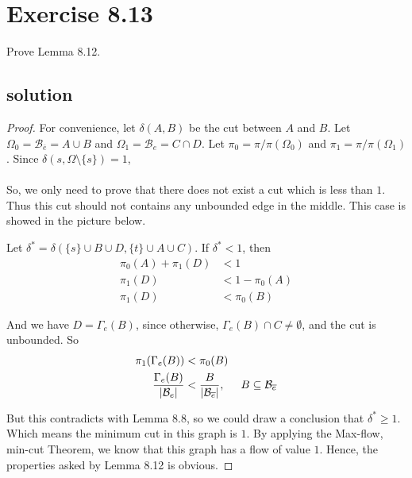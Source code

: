 \documentclass{article}
\begin{document}
\section{Exercise 8.13}
Prove Lemma 8.12.

\subsection{solution}

\begin{proof}
  
For convenience, let $\delta(A, B)$ be the cut between $A$  and $B$.
Let $\Omega_0 = \mathcal{B}_{\overline{e}} = A\cup B$ and $\Omega_1 = \mathcal{B}_e = C\cap D$.
Let $\pi_0 = \pi/\pi(\Omega_0)$ and $\pi_1 = \pi/\pi(\Omega_1)$.
Since $\delta(s, \Omega\setminus \{s\}) = 1$,

\paragraph{}
So, we only need to prove that there does not exist a cut which is less than $1$.
Thus this cut should not contains any unbounded edge in the middle.
This case is showed in the picture below.

\begin{center}
\scalebox{0.7}{}
\end{center}

Let $\delta^* = \delta(\{s\}\cup B\cup D, \{t\}\cup A\cup C)$.
If $\delta^* < 1$, then
\begin{align*}
    \pi_0(A) + \pi_1(D) &< 1 \\
    \pi_1(D) &< 1 - \pi_0(A) \\
    \pi_1(D) &< \pi_0(B)
\end{align*}

And we have $D = \Gamma_e(B)$, since otherwise, $\Gamma_e(B)\cap C\not= \emptyset$, and the cut is unbounded.
So
\begin{align*}
  \pi_1(\Gamma_e(B)) &< \pi_0(B) \\
  \frac{\Gamma_e(B)}{|\mathcal{B}_e|} &< \frac{B}{|\mathcal{B}_{\overline{e}}|}, \hspace{0.5cm} B\subseteq \mathcal{B}_{\overline{e}}
\end{align*}

But this contradicts with Lemma 8.8, so we could draw a conclusion that $\delta^* \geq 1$.
Which means the minimum cut in this graph is $1$.
By applying the Max-flow, min-cut Theorem, we know that this graph has a flow of value $1$.
Hence, the properties asked by Lemma 8.12 is obvious.
\end{proof}
\end{document}
